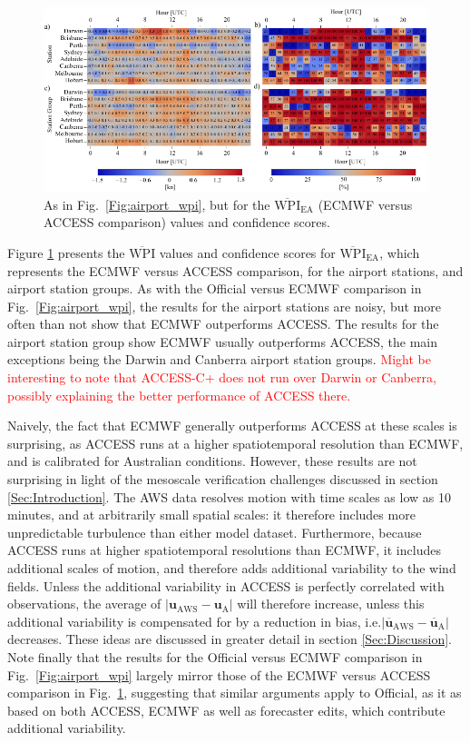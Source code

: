 \documentclass{ametsoc}
\begin{document}
\begin{figure}
\centering
\includegraphics[width=39pc]{airport_wpi_EA.pdf}
\caption{As in Fig.~\ref{Fig:airport_wpi}, but for the $\overline{\text{WPI}}_\text{EA}$ (ECMWF versus ACCESS comparison) values and confidence scores.}
\label{Fig:airport_wpi_EA}
\end{figure}

Figure \ref{Fig:airport_wpi_EA} presents the $\overline{\text{WPI}}$ values and confidence scores for $\overline{\text{WPI}}_\text{EA}$, which represents the ECMWF versus ACCESS comparison, for the airport stations, and airport station groups. As with the Official versus ECMWF comparison in Fig.~\ref{Fig:airport_wpi}, the results for the airport stations are noisy, but more often than not show that ECMWF outperforms ACCESS. The results for the airport station group show ECMWF usually outperforms ACCESS, the main exceptions being the Darwin and Canberra airport station groups. \textcolor{red}{Might be interesting to note that ACCESS-C+ does not run over Darwin or Canberra, possibly explaining the better performance of ACCESS there.}

Naively, the fact that ECMWF generally outperforms ACCESS at these scales is surprising, as ACCESS runs at a higher spatiotemporal resolution than ECMWF, and is calibrated for Australian conditions. However, these results are not surprising in light of the mesoscale verification challenges discussed in section \ref{Sec:Introduction}. The AWS data resolves motion with time scales as low as 10 minutes, and at arbitrarily small spatial scales: it therefore includes more unpredictable turbulence than either model dataset. Furthermore, because ACCESS runs at higher spatiotemporal resolutions than ECMWF, it includes additional scales of motion, and therefore adds additional variability to the wind fields. Unless the additional variability in ACCESS is perfectly correlated with observations, the average of $\left\lvert \boldsymbol{u}_{\text{AWS}}-\boldsymbol{u}_{\text{A}} \right\rvert$
will therefore increase, unless this additional variability is compensated for by a reduction in bias, i.e.$\left\lvert \overline{\boldsymbol{u}}_{\text{AWS}}-\overline{\boldsymbol{u}}_{\text{A}} \right\rvert$ decreases. These ideas are discussed in greater detail in section \ref{Sec:Discussion}. Note finally that the results for the Official versus ECMWF comparison in Fig.~\ref{Fig:airport_wpi} largely mirror those of the ECMWF versus ACCESS comparison in Fig.~\ref{Fig:airport_wpi_EA}, suggesting that similar arguments apply to Official, as it as based on both ACCESS, ECMWF as well as forecaster edits, which contribute additional variability.  
\end{document}
